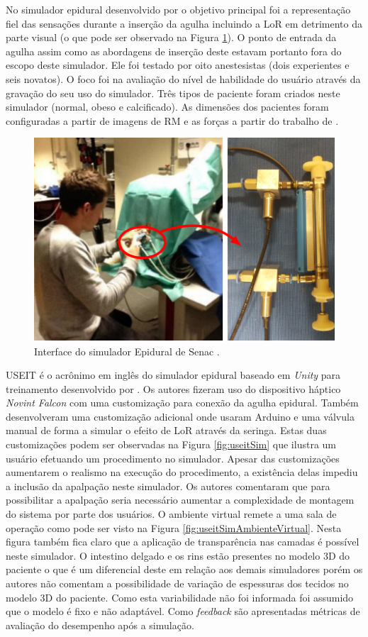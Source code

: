 No simulador epidural desenvolvido por \textcite{Senac2019} o objetivo principal foi a representação fiel das sensações durante a inserção da agulha incluindo a \acrshort{LoR} em detrimento da parte visual (o que pode ser observado na Figura \ref{fig:senacSim}). O ponto de entrada da agulha assim como as abordagens de inserção deste estavam portanto fora do escopo deste simulador. Ele foi testado por oito anestesistas (dois experientes e seis novatos). O foco foi na avaliação do nível de habilidade do usuário através da gravação do seu uso do simulador. Três tipos de paciente foram criados neste simulador (normal, obeso e calcificado). As dimensões dos pacientes foram configuradas a partir de imagens de \acrshort{RM} e as forças a partir do trabalho de \textcite{Tran2009}.

\begin{figure}[ht!]
    \centering
    \includegraphics[width=0.6\linewidth]{capitulos/figuras/Senac-ES.png} 
    \caption{Interface do simulador Epidural de Senac \cite{Senac2019}.}
    \label{fig:senacSim}
\end{figure}

USEIT é o acrônimo em inglês do simulador epidural baseado em \textit{Unity} para treinamento desenvolvido por \textcite{Moo-Young2021}. Os autores fizeram uso do dispositivo háptico \textit{Novint Falcon} com uma customização para conexão da agulha epidural. Também desenvolveram uma customização adicional onde usaram Arduino e uma válvula manual de forma a simular o efeito de \acrshort{LoR} através da seringa. Estas duas customizações podem ser observadas na Figura \ref{fig:useitSim} que ilustra um usuário efetuando um procedimento no simulador. Apesar das customizações aumentarem o realismo na execução do procedimento, a existência delas impediu a inclusão da apalpação neste simulador. Os autores comentaram que para possibilitar a apalpação seria necessário aumentar a complexidade de montagem do sistema por parte dos usuários. O ambiente virtual remete a uma sala de operação como pode ser visto na Figura \ref{fig:useitSimAmbienteVirtual}. Nesta figura também fica claro que a aplicação de transparência nas camadas é possível neste simulador. O intestino delgado e os rins estão presentes no modelo 3D do paciente o que é um diferencial deste em relação aos demais simuladores porém os autores não comentam a possibilidade de variação de espessuras dos tecidos no modelo 3D do paciente. Como esta variabilidade não foi informada foi assumido que o modelo é fixo e não adaptável. Como \textit{feedback} são apresentadas métricas de avaliação do desempenho após a simulação.

